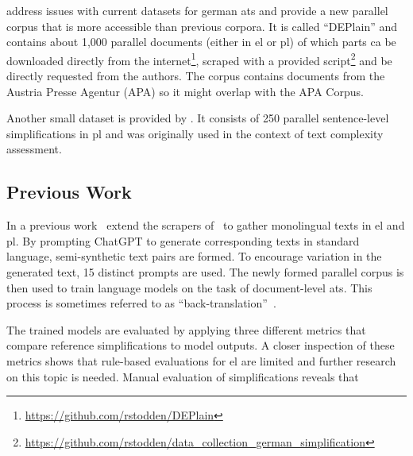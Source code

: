 \textcite{stodden-etal-2023-deplain} address issues with current datasets for german \gls{ats} and provide a new parallel corpus that is more accessible than previous corpora.
It is called \enquote{DEPlain} and contains about 1,000 parallel documents (either in \gls{el} or \gls{pl}) of which parts ca be downloaded directly from the internet\footnote{\url{https://github.com/rstodden/DEPlain}}, scraped with a provided script\footnote{\url{https://github.com/rstodden/data_collection_german_simplification}} and be directly requested from the authors.
The corpus contains documents from the Austria Presse Agentur (APA) so it might overlap with the APA Corpus.

Another small dataset is provided by \textcite{naderi2019subjective}.
It consists of 250 parallel sentence-level simplifications in \gls{pl} and was originally used in the context of text complexity assessment.


\subsection{Previous Work}\label{subsec:previous-work}

In a previous work~\textcite{klöser2024german} extend the scrapers of~\textcite{Ansch_tz_2023} to gather monolingual texts in \gls{el} and \gls{pl}.
By prompting ChatGPT to generate corresponding texts in standard language, semi-synthetic text pairs are formed.
To encourage variation in the generated text, 15 distinct prompts are used.
The newly formed parallel corpus is then used to train language models on the task of document-level \gls{ats}.
This process is sometimes referred to as \enquote{back-translation}~\autocite{sennrich-etal-2016-improving}.

The trained models are evaluated by applying three different metrics that compare reference simplifications to model outputs.
A closer inspection of these metrics shows that rule-based evaluations for \gls{el} are limited and further research on this topic is needed.
Manual evaluation of simplifications reveals that

